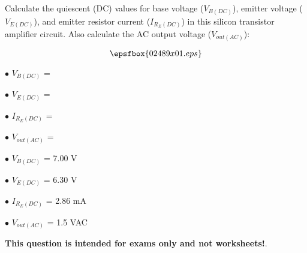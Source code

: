

Calculate the quiescent (DC) values for base voltage ($V_{B(DC)}$), emitter voltage ($V_{E(DC)}$), and emitter resistor current ($I_{R_E(DC)}$) in this silicon transistor amplifier circuit.  Also calculate the AC output voltage ($V_{out(AC)}$):

$$\epsfbox{02489x01.eps}$$

\medskip
\item{$\bullet$} $V_{B(DC)}$ = 
\item{$\bullet$} $V_{E(DC)}$ = 
\item{$\bullet$} $I_{R_E(DC)}$ = 
\item{$\bullet$} $V_{out(AC)}$ = 
\medskip







\medskip
\goodbreak
\item{$\bullet$} $V_{B(DC)}$ = 7.00 V
\item{$\bullet$} $V_{E(DC)}$ = 6.30 V
\item{$\bullet$} $I_{R_E(DC)}$ = 2.86 mA
\item{$\bullet$} $V_{out(AC)}$ = 1.5 VAC
\medskip







{\bf This question is intended for exams only and not worksheets!}.




